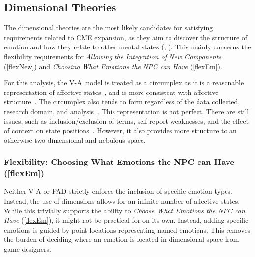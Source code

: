 \subsection{Dimensional Theories}
The dimensional theories are the most likely candidates for satisfying
requirements related to CME expansion, as they aim to discover the structure of
emotion and how they relate to other mental
states (;
). This mainly concerns the flexibility
requirements for \textit{Allowing the Integration of New Components}
(\ref{flexNew}) and \textit{Choosing What Emotions the NPC can Have}
(\ref{flexEm}).

For this analysis, the V-A model is treated as a circumplex as it is a
reasonable representation of affective
states~\citep[p.~296]{remington2000reexamining}, and is more consistent with
affective structure~\citep[p.~12]{barrett1999structure}. The circumplex
also tends to form regardless of the data collected, research domain, and
analysis~\citep[p.~211]{russell1997how}. This representation is not perfect.
There are still issues, such as inclusion/exclusion of terms, self-report
weaknesses, and the effect of context on state
positions~\citep[p.~298]{remington2000reexamining}. However, it also provides
more structure to an otherwise two-dimensional and nebulous space.

\subsubsection{Flexibility: Choosing What Emotions the NPC can Have
(\ref{flexEm})}
Neither V-A or PAD strictly enforce the inclusion of specific emotion types.
Instead, the use of dimensions allows for an infinite number of affective
states. While this trivially supports the ability to \textit{Choose What
    Emotions the NPC can Have} (\ref{flexEm}), it might not be practical for
\progname{} on its own. Instead, adding specific emotions is guided by point
locations representing named emotions. This removes the burden of deciding
where an emotion is located in dimensional space from game designers.

